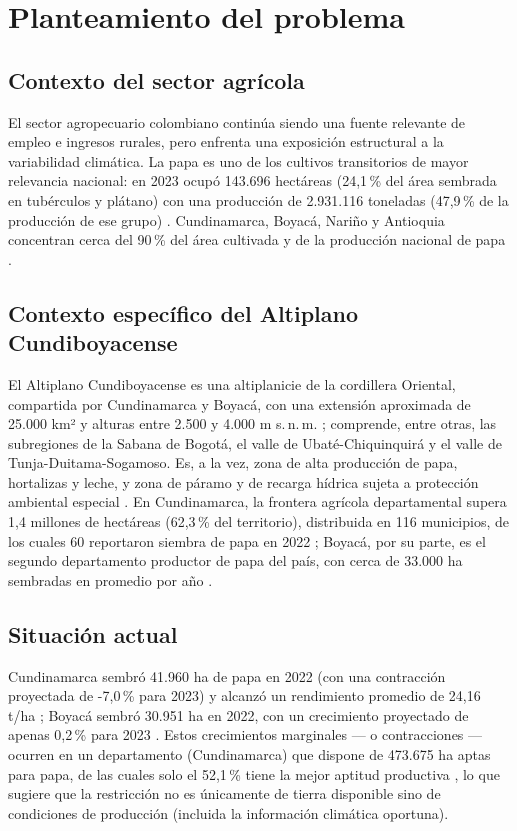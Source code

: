 \documentclass[11pt,a4paper]{article}
\begin{document}
\section{Planteamiento del problema}
\label{sec:problema}

\subsection{Contexto del sector agrícola}
El sector agropecuario colombiano continúa siendo una fuente relevante de empleo e ingresos rurales, pero enfrenta una exposición estructural a la variabilidad climática. La papa es uno de los cultivos transitorios de mayor relevancia nacional: en 2023 ocupó 143.696 hectáreas (24,1\,\% del área sembrada en tubérculos y plátano) con una producción de 2.931.116 toneladas (47,9\,\% de la producción de ese grupo) \citep{dane_ena2023}. Cundinamarca, Boyacá, Nariño y Antioquia concentran cerca del 90\,\% del área cultivada y de la producción nacional de papa \citep{agronet_papa}.

\subsection{Contexto específico del Altiplano Cundiboyacense}
El Altiplano Cundiboyacense es una altiplanicie de la cordillera Oriental, compartida por Cundinamarca y Boyacá, con una extensión aproximada de 25.000 km² y alturas entre 2.500 y 4.000 m s.\,n.\,m. \citep{wikipedia_altiplano}; comprende, entre otras, las subregiones de la Sabana de Bogotá, el valle de Ubaté-Chiquinquirá y el valle de Tunja-Duitama-Sogamoso. Es, a la vez, zona de alta producción de papa, hortalizas y leche, y zona de páramo y de recarga hídrica sujeta a protección ambiental especial \citep{corpoboyaca_paramo,corpoboyaca_car_paramo}. En Cundinamarca, la frontera agrícola departamental supera 1,4 millones de hectáreas (62,3\,\% del territorio), distribuida en 116 municipios, de los cuales 60 reportaron siembra de papa en 2022 \citep{fedepapa_cundinamarca2023}; Boyacá, por su parte, es el segundo departamento productor de papa del país, con cerca de 33.000 ha sembradas en promedio por año \citep{fedepapa_boyaca2023}.

\subsection{Situación actual}
Cundinamarca sembró 41.960 ha de papa en 2022 (con una contracción proyectada de -7{,}0\,\% para 2023) y alcanzó un rendimiento promedio de 24{,}16 t/ha \citep{fedepapa_cundinamarca2023}; Boyacá sembró 30.951 ha en 2022, con un crecimiento proyectado de apenas 0{,}2\,\% para 2023 \citep{fedepapa_boyaca2023}. Estos crecimientos marginales --- o contracciones --- ocurren en un departamento (Cundinamarca) que dispone de 473.675 ha aptas para papa, de las cuales solo el 52{,}1\,\% tiene la mejor aptitud productiva \citep{fedepapa_cundinamarca2023}, lo que sugiere que la restricción no es únicamente de tierra disponible sino de condiciones de producción (incluida la información climática oportuna).
\end{document}

